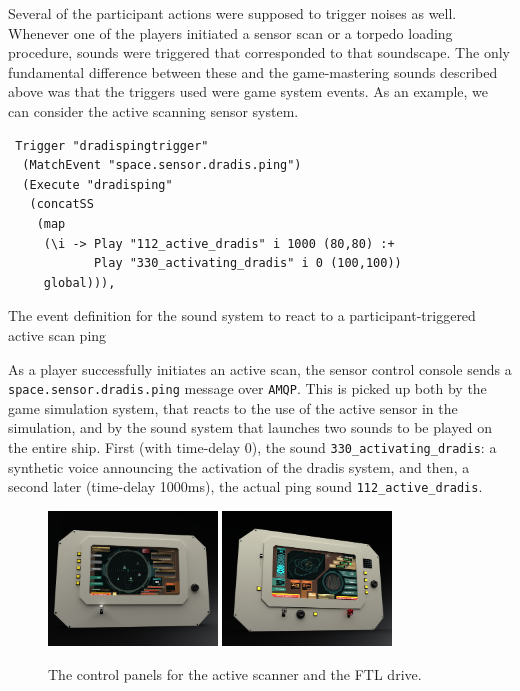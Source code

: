 Several of the participant actions were supposed to trigger noises as well. Whenever one of the players initiated a sensor scan or a torpedo loading procedure, sounds were triggered that corresponded to that soundscape. The only fundamental difference between these and the game-mastering sounds described above was that the triggers used were game system events. As an example, we can consider the active scanning sensor system.

\begin{listing}
\begin{verbatim}
 Trigger "dradispingtrigger" 
  (MatchEvent "space.sensor.dradis.ping") 
  (Execute "dradisping" 
   (concatSS 
    (map 
     (\i -> Play "112_active_dradis" i 1000 (80,80) :+ 
            Play "330_activating_dradis" i 0 (100,100)) 
     global))),
\end{verbatim}
\caption{The event definition for the sound system to react to a participant-triggered
  active scan ping}
\end{listing}

As a player successfully initiates an active scan, the sensor control console sends a \texttt{space.sensor.dradis.ping} message over \texttt{AMQP}. This is picked up both by the game simulation system, that reacts to the use of the active sensor in the simulation, and by the sound system that launches two sounds to be played on the entire ship. First (with time-delay 0), the sound \texttt{330\_activating\_dradis}: a synthetic voice announcing the activation of the dradis system, and then, a second later (time-delay 1000ms), the actual ping sound \texttt{112\_active\_dradis}.

\begin{figure}
  \includegraphics[width=0.4\textwidth]{img/Dradis.jpg}\hfill
  \includegraphics[width=0.4\textwidth]{img/Helm.jpg}
  \caption{The control panels for the active scanner and the FTL drive.}
  \label{fig:dradis}
\end{figure}


